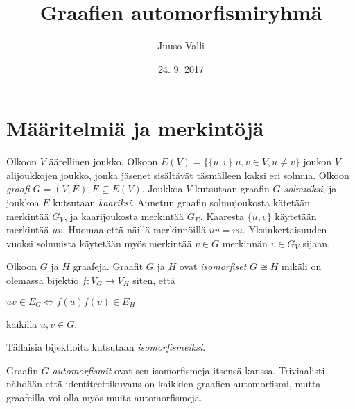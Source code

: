 \documentclass[a4paper, 12pt]{article}
\theoremstyle{definition}
\theoremstyle{plain}
\begin{document}
\title{Graafien automorfismiryhmä}
\author{Juuso Valli}
\date{24. 9. 2017}

\maketitle

\begin{abstract}
\end{abstract}

\tableofcontents

\newpage

\section{Määritelmiä ja merkintöjä}

Olkoon $V$ äärellinen joukko. Olkoon $E(V) = \{\{u, v\} | u, v \in V, u \neq v\}$ joukon $V$ alijoukkojen joukko, jonka jäsenet sisältävät täsmälleen kaksi eri solmua.
Olkoon \emph{graafi} $G = (V, E), E \subseteq E(V)$. Joukkoa $V$ kutsutaan graafin $G$ \emph{solmuiksi}, ja joukkoa $E$ kutsutaan \emph{kaariksi}. Annetun graafin solmujoukosta kätetään merkintää $G_V$, ja kaarijoukosta merkintää $G_E$.
Kaaresta $\{u, v\}$ käytetään merkintää $uv$. Huomaa että näillä merkinnöillä $uv = vu$.
Yksinkertaisuuden vuoksi solmuista käytetään myös merkintää $v \in G$ merkinnän $v \in G_V$ sijaan.

Olkoon $G$ ja $H$ graafeja. Graafit $G$ ja $H$ ovat \emph{isomorfiset} $G \cong H$ mikäli on olemassa bijektio $f: V_G \rightarrow V_H$ siten, että
\begin{center}
\begin{math}
uv \in E_G \Longleftrightarrow f(u)f(v) \in E_H
\end{math}
\end{center}
kaikilla $u, v \in G$.

Tällaisia bijektioita kutsutaan \emph{isomorfismeiksi}.

Graafin $G$ \emph{automorfismit} ovat sen isomorfismeja itsensä kanssa. Triviaalisti nähdään että identiteettikuvaus on kaikkien graafien automorfismi, mutta graafeilla voi olla myös muita automorfismeja.
\end{document}
